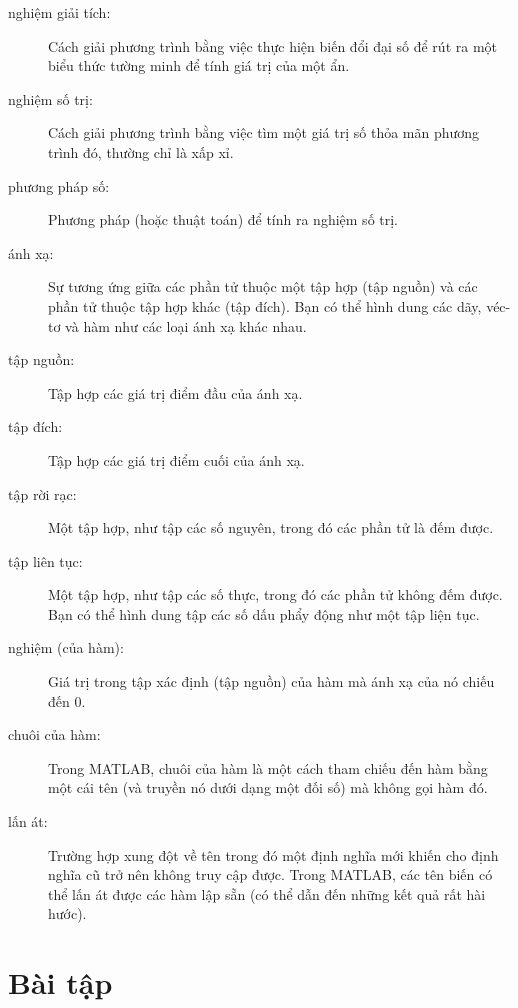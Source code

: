 \documentclass[12pt]{book}
\begin{document}
\begin{description}

\item[nghiệm giải tích:] Cách giải phương trình bằng việc thực hiện
biến đổi đại số để rút ra một biểu thức tường minh để tính giá trị
của một ẩn.

\item[nghiệm số trị:] Cách giải phương trình bằng việc tìm một 
giá trị số thỏa mãn phương trình đó, thường chỉ là xấp xỉ.

\item[phương pháp số:] Phương pháp (hoặc thuật toán) để tính ra
nghiệm số trị.

\item[ánh xạ:] Sự tương ứng giữa các phần tử thuộc một tập hợp
(tập nguồn) và các phần tử thuộc tập hợp khác (tập đích). Bạn có thể
hình dung các dãy, véc-tơ và hàm như các loại ánh xạ khác nhau.

\item[tập nguồn:] Tập hợp các giá trị điểm đầu của ánh xạ.

\item[tập đích:] Tập hợp các giá trị điểm cuối của ánh xạ.

\item[tập rời rạc:] Một tập hợp, như tập các số nguyên, trong đó
các phần tử là đếm được.

\item[tập liên tục:] Một tập hợp, như tập các số thực, trong đó
các phần tử không đếm được. Bạn có thể hình dung tập các số dấu
phẩy động như một tập liện tục.

\item[nghiệm (của hàm):] Giá trị trong tập xác định (tập nguồn) của
hàm mà ánh xạ của nó chiếu đến 0.

\item[chuôi của hàm:] Trong MATLAB, chuôi của hàm là một cách
tham chiếu đến hàm bằng một cái tên (và truyền nó dưới dạng một
đối số) mà không gọi hàm đó.

\item[lấn át:] Trường hợp xung đột về tên trong đó một định nghĩa mới
khiến cho định nghĩa cũ trở nên không truy cập được. Trong MATLAB,
các tên biến có thể lấn át được các hàm lập sẵn (có thể dẫn đến những
kết quả rất hài hước).

\end{description}

\section{Bài tập}
\end{document}

